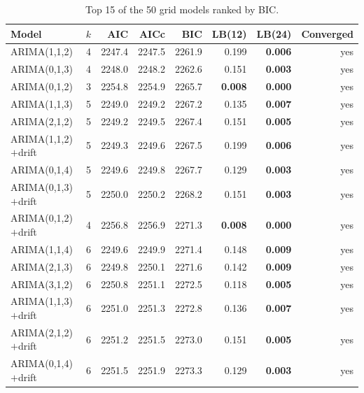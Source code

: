 \begin{longtable}{lcrrrrrr}\caption{Top 15 of the 50 grid models ranked by BIC.}\label{tab:top15}\\\toprule
Model & $k$ & AIC & AICc & BIC & LB(12) & LB(24) & Converged\\\midrule\endfirsthead
ARIMA(1,1,2) & 4 & 2247.4 & 2247.5 & 2261.9 & 0.199 & \textbf{0.006} & yes\\
ARIMA(0,1,3) & 4 & 2248.0 & 2248.2 & 2262.6 & 0.151 & \textbf{0.003} & yes\\
ARIMA(0,1,2) & 3 & 2254.8 & 2254.9 & 2265.7 & \textbf{0.008} & \textbf{0.000} & yes\\
ARIMA(1,1,3) & 5 & 2249.0 & 2249.2 & 2267.2 & 0.135 & \textbf{0.007} & yes\\
ARIMA(2,1,2) & 5 & 2249.2 & 2249.5 & 2267.4 & 0.151 & \textbf{0.005} & yes\\
ARIMA(1,1,2)$+$drift & 5 & 2249.3 & 2249.6 & 2267.5 & 0.199 & \textbf{0.006} & yes\\
ARIMA(0,1,4) & 5 & 2249.6 & 2249.8 & 2267.7 & 0.129 & \textbf{0.003} & yes\\
ARIMA(0,1,3)$+$drift & 5 & 2250.0 & 2250.2 & 2268.2 & 0.151 & \textbf{0.003} & yes\\
ARIMA(0,1,2)$+$drift & 4 & 2256.8 & 2256.9 & 2271.3 & \textbf{0.008} & \textbf{0.000} & yes\\
ARIMA(1,1,4) & 6 & 2249.6 & 2249.9 & 2271.4 & 0.148 & \textbf{0.009} & yes\\
ARIMA(2,1,3) & 6 & 2249.8 & 2250.1 & 2271.6 & 0.142 & \textbf{0.009} & yes\\
ARIMA(3,1,2) & 6 & 2250.8 & 2251.1 & 2272.5 & 0.118 & \textbf{0.005} & yes\\
ARIMA(1,1,3)$+$drift & 6 & 2251.0 & 2251.3 & 2272.8 & 0.136 & \textbf{0.007} & yes\\
ARIMA(2,1,2)$+$drift & 6 & 2251.2 & 2251.5 & 2273.0 & 0.151 & \textbf{0.005} & yes\\
ARIMA(0,1,4)$+$drift & 6 & 2251.5 & 2251.9 & 2273.3 & 0.129 & \textbf{0.003} & yes\\
\bottomrule\end{longtable}